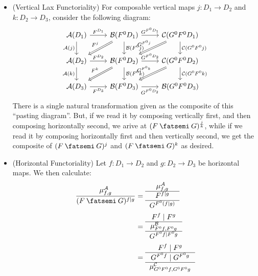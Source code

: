 \documentclass[DynamicalBook]{subfiles}
\begin{document}
\begin{itemize}
  \item (Vertical Lax Functoriality) For composable vertical maps $j : D_1 \to
    D_2$ and $k : D_2 \to D_3$, consider the following diagram:
\[
\begin{tikzcd}
  \cat{A}(D_1) \ar[d, "{\cat{A}(j)}"'] \ar[r, "F^{D_1}"] & \cat{B}(F^0D_1)
\ar[dl, Rightarrow, "F^j"']  \ar[d, "\cat{B}(F^0j)"] \ar[r, "G^{F^0D_1}"] & \cat{C}(G^0F^0D_1) \ar[d,
"\cat{C}(G^0F^0 j)"] \ar[dl, Rightarrow, "G^{F^0 j}"']\\
\cat{A}(D_2) \ar[d, "{\cat{A}(k)}"']\ar[r,"F^{D_2}"] & \cat{B}(F^0D_2)\ar[d, "\cat{B}(F^0k)"] \ar[dl, Rightarrow, "F^k"'] \ar[r, "G^{F^0 D_2}"] &
\cat{C}(G^0F^0D_2) \ar[dl, Rightarrow, "G^{F^0 k}"']\ar[d, "\cat{C}(G^0F^0 k)"] \\
\cat{A}(D_3) \ar[r,"F^{D_3}"']& \cat{B}(F^0D_3) \ar[r, "G^{F^0 D_2}"'] & \cat{B}(G^0 F^0 D_3)
\end{tikzcd}
\]
There is a single natural transformation given as the composite of this
``pasting diagram''. But, if we read it by composing vertically first, and then
composing horizontally second, we arive at $(F \then G)^{\frac{j}{k}}$, while if
we read it by composing horizontally first and then vertically second, we get
the composite of $(F \then G)^j$ and $(F \then G)^k$ as desired.
\item (Horizontal Functoriality) Let $f : D_1 \to D_2$ and $g : D_2 \to D_3$ be
  horizontal maps. We then calculate:
  \begin{align*}
    \frac{\mu_{f,g}^{\cat{A}}}{(F \then G)^{f \mid g}} &= {\begin{tabular}{c}$\mu_{f, g}^{\cat{A}}$ \\ \hline $F^{f \mid g}$ \\ \hline $G^{F^0(f \mid g)}$ \end{tabular}} \\
    &= {\begin{tabular}{c} $F^f \mid F^g$ \\  \hline $\mu^{\cat{B}}_{F^0f, F^0g}$ \\ \hline  $G^{F^0f \mid F^0 g}$ \end{tabular}} \\
    &= {\begin{tabular}{c} $F^f \mid F^g$ \\ \hline $G^{F^0f} \mid G^{F^0 g}$ \\  \hline $\mu^{\cat{C}}_{G^0F^0f, G^0F^0g}$   \end{tabular}} \\

\end{align*}
\end{itemize}
\end{document}
